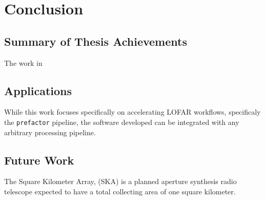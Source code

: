 \chapter{Conclusion}

\label{ch:conclusions}


\section{Summary of Thesis Achievements}

The work in 


\section{Applications}

While this work focuses specifically on accelerating LOFAR workflows, specificaly the \texttt{prefactor} pipeline, the software developed can be integrated with any arbitrary processing pipeline.  


\section{Future Work}

The Square Kilometer Array, (SKA) is a planned aperture synthesis radio telescope expected to have a total collecting area of one square kilometer.  
